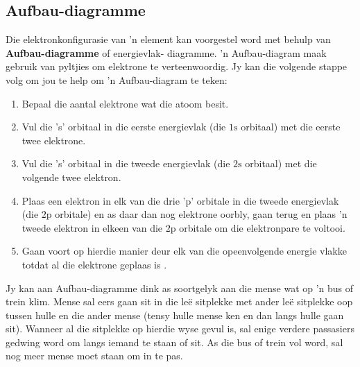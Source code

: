 \subsection*{Aufbau-diagramme}        
\label{m38741*id259628}Die elektronkonfigurasie van 'n element kan voorgestel word met behulp van \textbf{Aufbau-diagramme} of energievlak- diagramme. 'n Aufbau-diagram maak gebruik van pyltjies om elektrone te verteenwoordig. Jy kan die volgende stappe volg om jou te help om 'n Aufbau-diagram te teken:\par 
        \label{m38741*id259639}\begin{enumerate}[noitemsep, label=\textbf{\arabic*}. ] 
            \label{m38741*uid96}\item Bepaal die aantal elektrone wat die atoom besit.
\label{m38741*uid97}\item Vul die 's' orbitaal in die eerste energievlak (die $1\text{s}$ orbitaal) met die eerste twee elektrone.
\label{m38741*uid98}\item Vul die 's' orbitaal in die tweede energievlak (die $2\text{s}$ orbitaal) met die volgende twee elektron.
\label{m38741*uid99}\item Plaas een elektron in elk van die drie 'p' orbitale in die tweede energievlak (die $2\text{p}$ orbitale) en as daar dan nog elektrone oorbly, gaan terug en plaas 'n tweede elektron in elkeen van die $2\text{p}$ orbitale om die elektronpare te voltooi.
\label{m38741*uid100}\item Gaan voort op hierdie manier deur elk van die opeenvolgende energie vlakke totdat al die elektrone geplaas is .
\end{enumerate}

        

\label{m38741*eip-873}Jy kan aan Aufbau-diagramme dink as soortgelyk aan die mense wat op 'n bus of trein klim. Mense sal eers gaan sit in die leë sitplekke met ander leë sitplekke oop tussen hulle en die ander mense (tensy hulle mense ken en dan langs hulle gaan sit). Wanneer al die sitplekke op hierdie wyse gevul is, sal enige verdere passasiers gedwing word om langs iemand te staan ​of sit. As die bus of trein vol word, sal nog meer mense moet staan ​om in te pas.\par \label{m38741*id259728}
